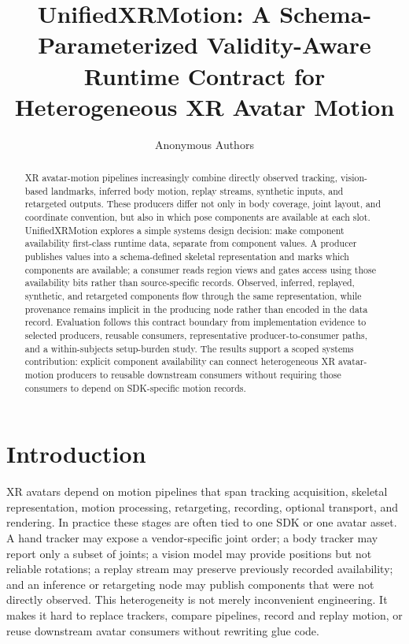 \documentclass[runningheads]{llncs}
\begin{document}
\title{UnifiedXRMotion: A Schema-Parameterized Validity-Aware Runtime Contract for Heterogeneous XR Avatar Motion}
\author{Anonymous Authors}
\maketitle

\begin{abstract}
	XR avatar-motion pipelines increasingly combine directly observed tracking, vision-based landmarks, inferred body motion, replay streams, synthetic inputs, and retargeted outputs. These producers differ not only in body coverage, joint layout, and coordinate convention, but also in which pose components are available at each slot. UnifiedXRMotion explores a simple systems design decision: make component availability first-class runtime data, separate from component values. A producer publishes values into a schema-defined skeletal representation and marks which components are available; a consumer reads region views and gates access using those availability bits rather than source-specific records. Observed, inferred, replayed, synthetic, and retargeted components flow through the same representation, while provenance remains implicit in the producing node rather than encoded in the data record. Evaluation follows this contract boundary from implementation evidence to selected producers, reusable consumers, representative producer-to-consumer paths, and a within-subjects setup-burden study. The results support a scoped systems contribution: explicit component availability can connect heterogeneous XR avatar-motion producers to reusable downstream consumers without requiring those consumers to depend on SDK-specific motion records.
\end{abstract}

\section{Introduction}\label{sec:introduction}
XR avatars depend on motion pipelines that span tracking acquisition, skeletal representation, motion processing, retargeting, recording, optional transport, and rendering. In practice these stages are often tied to one SDK or one avatar asset. A hand tracker may expose a vendor-specific joint order; a body tracker may report only a subset of joints; a vision model may provide positions but not reliable rotations; a replay stream may preserve previously recorded availability; and an inference or retargeting node may publish components that were not directly observed. This heterogeneity is not merely inconvenient engineering. It makes it hard to replace trackers, compare pipelines, record and replay motion, or reuse downstream avatar consumers without rewriting glue code.
\end{document}
